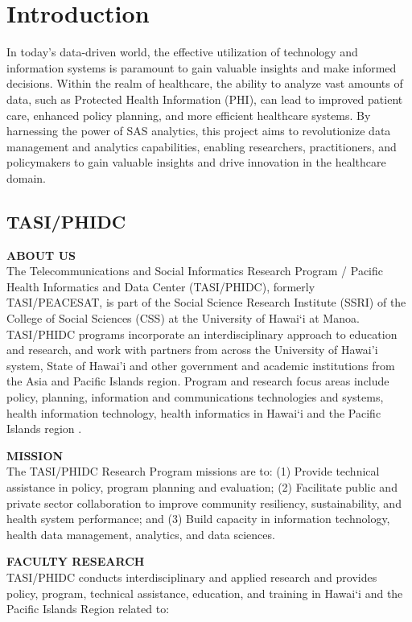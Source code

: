 \section{Introduction} \label{section: introduction}

In today's data-driven world, the effective utilization of technology and information systems is paramount to gain valuable insights and make informed decisions. Within the realm of healthcare, the ability to analyze vast amounts of data, such as Protected Health Information (PHI), can lead to improved patient care, enhanced policy planning, and more efficient healthcare systems. By harnessing the power of SAS analytics, this project aims to revolutionize data management and analytics capabilities, enabling researchers, practitioners, and policymakers to gain valuable insights and drive innovation in the healthcare domain. 

\subsection{TASI/PHIDC}

\textbf{ABOUT US}
\\
The Telecommunications and Social Informatics Research Program / Pacific Health Informatics and Data Center (TASI/PHIDC), formerly TASI/PEACESAT, is part of the Social Science Research Institute (SSRI) of the College of Social Sciences (CSS) at the University of Hawai‘i at Manoa. TASI/PHIDC programs incorporate an interdisciplinary approach to education and research, and work with partners from across the University of Hawai’i system, State of Hawai’i and other government and academic institutions from the Asia and Pacific Islands region. Program and research focus areas include policy, planning, information and communications technologies and systems, health information technology, health informatics in Hawai‘i and the Pacific Islands region \cite{TASI}.

\textbf{MISSION}
\\
The TASI/PHIDC Research Program missions are to: (1) Provide technical assistance in policy, program planning and evaluation; (2) Facilitate public and private sector collaboration to improve community resiliency, sustainability, and health system performance; and (3) Build capacity in information technology, health data management, analytics, and data sciences.

\textbf{FACULTY RESEARCH}
\\
TASI/PHIDC conducts interdisciplinary and applied research and provides policy, program, technical assistance, education, and training in Hawai‘i and the Pacific Islands Region related to:

